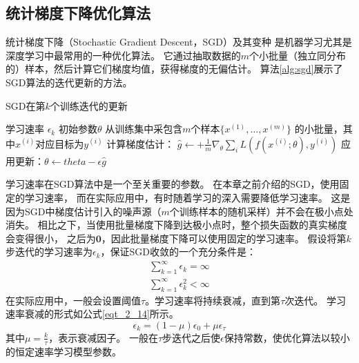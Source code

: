\subsection{统计梯度下降优化算法}
统计梯度下降（Stochastic Gradient Descent，SGD）及其变种
是机器学习尤其是深度学习中最常用的一种优化算法\cite{bottou2010large}。
它通过抽取数据的$m$个小批量（独立同分布的）样本，然后计算它们梯度均值，获得梯度的无偏估计。
算法\ref{alg:sgd}展示了SGD算法的迭代更新的方法。

\begin{algorithm}[ht]
	\caption{SGD在第$k$个训练迭代的更新}
	\label{alg:sgd}
	\begin{algorithmic}
		\REQUIRE 学习速率 $\epsilon_k$
		\REQUIRE 初始参数$\theta$
		\STATE 从训练集中采包含$m$个样本$\{ x^{(1)},\dots, x^{(m)}\}$ 的小批量，其中$x^{(i)}$对应目标为$y^{(i)}$
		\STATE 计算梯度估计： $\hat{g} \leftarrow + 
		\frac{1}{m} \nabla_{\theta} \sum_i L(f(x^{(i)};\theta),y^{(i)})$
		\STATE 应用更新：$\theta \leftarrow theta - \epsilon \hat{g}$
		\ENDWHILE
	\end{algorithmic}
\end{algorithm}

学习速率在SGD算法中是一个至关重要的参数。
在本章之前介绍的SGD，使用固定的学习速率，
而在实际应用中，有时随着学习的深入需要降低学习速率。
这是因为SGD中梯度估计引入的噪声源（$m$个训练样本的随机采样）并不会在极小点处消失。
相比之下，当使用批量梯度下降到达极小点时，整个损失函数的真实梯度会变得很小，
之后为$\mathbf{0}$，因此批量梯度下降可以使用固定的学习速率。
假设将第$k$步迭代的学习速率为$\epsilon_k$，保证SGD收敛的一个充分条件是：
\begin{equation}
\label{eq:8.12}
	\begin{aligned}
		\sum_{k=1}^\infty \epsilon_k = \infty\\
		\sum_{k=1}^\infty \epsilon_k^2 < \infty
	\end{aligned}
\end{equation}
在实际应用中，一般会设置阈值$\tau$。学习速率将持续衰减，直到第$\tau$次迭代。
学习速率衰减的形式如公式\eqref{eqt_2_14}所示。
\begin{equation}
\label{eqt_2_14}
\epsilon_k = (1-\mu) \epsilon_0 + \mu \epsilon_\tau
\end{equation}
其中$\mu = \frac{k}{\tau}$，表示衰减因子。
一般在$\tau$步迭代之后使$\epsilon$保持常数，使优化算法以较小的恒定速率学习模型参数。

